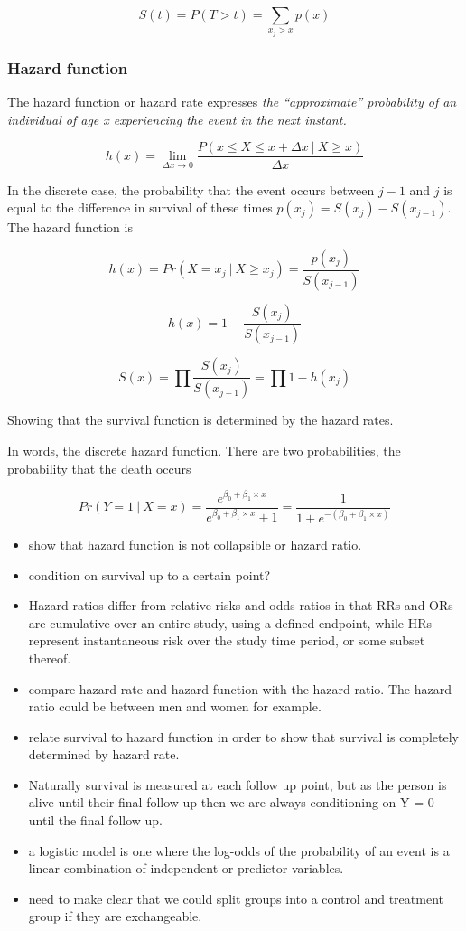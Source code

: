 \documentclass[11pt]{article}
\providecommand{\tightlist}{%
      \setlength{\itemsep}{0pt}\setlength{\parskip}{0pt}}
\begin{document}
\[S(t) = P(T > t) = \sum_{x_j > x}p(x)\]

\subsubsection{Hazard function}\label{hazard-function}

The hazard function or hazard rate expresses \emph{the ``approximate''
probability of an individual of age x experiencing the event in the next
instant.}

\[h(x) = \lim\limits_{\Delta x \to 0}\frac{P(x \le X \le x + \Delta x\ |\ X \ge x)}{\Delta x}\]

In the discrete case, the probability that the event occurs between
\(j-1\) and \(j\) is equal to the difference in survival of these times
\(p(x_j) = S(x_j) - S(x_{j-1})\). The hazard function is

\[h(x) = Pr(X = x_j\ |\ X \ge x_j) = \frac{p(x_j)}{S(x_{j - 1})}\]

\[h(x) = 1 - \frac{S(x_j)}{S(x_{j - 1})}\]

\[S(x) = \prod \frac{S(x_j)}{S(x_{j - 1})} = \prod 1 - h(x_j)\]

Showing that the survival function is determined by the hazard rates.

In words, the discrete hazard function. There are two probabilities, the
probability that the death occurs

\[Pr(Y=1\ |\ X=x) = \frac{e^{\beta_0 + \beta_1 \times x}}{e^{\beta_0 + \beta_1 \times x} + 1} = \frac{1}{1 + e^{-(\beta_0 + \beta_1 \times x)}}\]

\begin{itemize}
\tightlist
\item
  show that hazard function is not collapsible or hazard ratio.
\item
  condition on survival up to a certain point?
\item
  Hazard ratios differ from relative risks and odds ratios in that RRs
  and ORs are cumulative over an entire study, using a defined endpoint,
  while HRs represent instantaneous risk over the study time period, or
  some subset thereof.
\item
  compare hazard rate and hazard function with the hazard ratio. The
  hazard ratio could be between men and women for example.
\item
  relate survival to hazard function in order to show that survival is
  completely determined by hazard rate.
\item
  Naturally survival is measured at each follow up point, but as the
  person is alive until their final follow up then we are always
  conditioning on Y = 0 until the final follow up.
\item
  a logistic model is one where the log-odds of the probability of an
  event is a linear combination of independent or predictor variables.
\item
  need to make clear that we could split groups into a control and
  treatment group if they are exchangeable.
\end{itemize}
\end{document}
